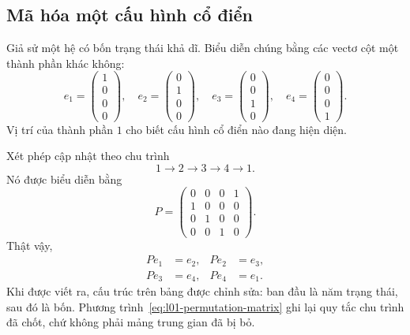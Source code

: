 \subsection{Mã hóa một cấu hình cổ điển}

Giả sử một hệ có bốn trạng thái khả dĩ. Biểu diễn chúng bằng các vectơ cột một thành phần khác không:
\begin{equation}
  e_1=
  \begin{pmatrix}1\\0\\0\\0\end{pmatrix},
  \quad
  e_2=
  \begin{pmatrix}0\\1\\0\\0\end{pmatrix},
  \quad
  e_3=
  \begin{pmatrix}0\\0\\1\\0\end{pmatrix},
  \quad
  e_4=
  \begin{pmatrix}0\\0\\0\\1\end{pmatrix}.
  \label{eq:l01-one-hot}
\end{equation}
Vị trí của thành phần \(1\) cho biết cấu hình cổ điển nào đang hiện diện.

Xét phép cập nhật theo chu trình
\begin{equation}
  1\longrightarrow2\longrightarrow3\longrightarrow4\longrightarrow1.
  \label{eq:l01-four-cycle}
\end{equation}
Nó được biểu diễn bằng
\begin{equation}
  P=
  \begin{pmatrix}
    0&0&0&1\\
    1&0&0&0\\
    0&1&0&0\\
    0&0&1&0
  \end{pmatrix}.
  \label{eq:l01-permutation-matrix}
\end{equation}
Thật vậy,
\begin{equation}
  \begin{aligned}
    Pe_1&=e_2, & Pe_2&=e_3,\\
    Pe_3&=e_4, & Pe_4&=e_1.
  \end{aligned}
\end{equation}
Khi được viết ra, cấu trúc trên bảng được chỉnh sửa: ban đầu là năm trạng thái, sau đó là bốn. Phương trình~\eqref{eq:l01-permutation-matrix} ghi lại quy tắc chu trình đã chốt, chứ không phải mảng trung gian đã bị bỏ.

